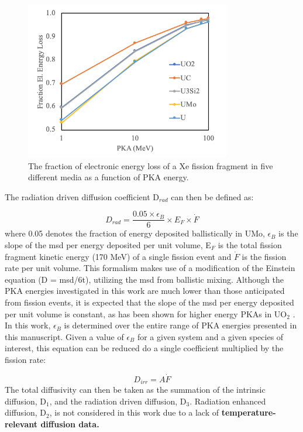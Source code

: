 \documentclass[review]{elsarticle}
\providecommand{\DIFaddtex}[1]{{\bf #1}} %
\providecommand{\DIFdeltex}[1]{} %
\providecommand{\DIFaddbegin}{\protect\color{blue}} %
\providecommand{\DIFaddend}{\protect\color{black}} %
\providecommand{\DIFdelbegin}{\protect\color{red}} %
\providecommand{\DIFdelend}{\protect\color{black}} %
\providecommand{\DIFadd}[1]{\texorpdfstring{\DIFaddtex{#1}}{#1}} %
\providecommand{\DIFdel}[1]{\texorpdfstring{\DIFdeltex{#1}}{}} %
\newcommand{\DIFscaledelfig}{0.5}
\newlength{\DIFdelgraphicswidth} %
\newlength{\DIFdelgraphicsheight} %
\newcommand{\DIFaddincludegraphics}[2][]{{\color{blue}\fbox{\DIFOincludegraphics[#1]{#2}}}} %
\newcommand{\DIFdelincludegraphics}[2][]{%
\sbox{\DIFdelgraphicsbox}{\DIFOincludegraphics[#1]{#2}}%
\settoboxwidth{\DIFdelgraphicswidth}{\DIFdelgraphicsbox} %
\settoboxtotalheight{\DIFdelgraphicsheight}{\DIFdelgraphicsbox} %
\scalebox{\DIFscaledelfig}{%
\parbox[b]{\DIFdelgraphicswidth}{\usebox{\DIFdelgraphicsbox}\\[-\baselineskip] \rule{\DIFdelgraphicswidth}{0em}}\llap{\resizebox{\DIFdelgraphicswidth}{\DIFdelgraphicsheight}{%
\setlength{\unitlength}{\DIFdelgraphicswidth}%
\begin{picture}(1,1)%
\thicklines\linethickness{2pt} %
{\color[rgb]{1,0,0}\put(0,0){\framebox(1,1){}}}%
{\color[rgb]{1,0,0}\put(0,0){\line( 1,1){1}}}%
{\color[rgb]{1,0,0}\put(0,1){\line(1,-1){1}}}%
\end{picture}%
}\hspace*{3pt}}} %
} %
\DeclareRobustCommand{\DIFaddbegin}{\DIFOaddbegin \let\includegraphics\DIFaddincludegraphics} %
\DeclareRobustCommand{\DIFaddend}{\DIFOaddend \let\includegraphics\DIFOincludegraphics} %
\DeclareRobustCommand{\DIFdelbegin}{\DIFOdelbegin \let\includegraphics\DIFdelincludegraphics} %
\DeclareRobustCommand{\DIFdelend}{\DIFOaddend \let\includegraphics\DIFOincludegraphics} %
\begin{document}
\begin{figure}[h]
 \centering
 \includegraphics[width=0.8\textwidth]{2_el_energy_loss.png} 
 \caption{The fraction of electronic energy loss of a Xe fission fragment in five different media as a function of PKA energy.}
 \label{fig:eloss}
\end{figure} 

The radiation driven diffusion coefficient D$_{rad}$ can then be defined as:

\begin{equation}
\label{eq:1}
D_{rad} = \frac{0.05 \times \epsilon_{B}}{6} \times E_{F} \times \dot F
\end{equation} where 0.05 denotes the fraction of energy deposited ballistically in UMo, $\epsilon_B$ is the slope of the msd per energy deposited per unit volume, E$_F$ is the total fission fragment kinetic energy (170 MeV) of a single fission event and $\dot F$ is the fission rate per unit volume. This formalism makes use of a modification of the Einstein equation (D = msd/6t), utilizing the msd from ballistic mixing. Although the PKA energies investigated in this work are much lower than those anticipated from fission events, it is expected that the slope of the msd per energy deposited per unit volume is constant, as has been shown for higher energy PKAs in UO$_2$ \cite{cooper2016}. In this work, $\epsilon_B$ is determined over the entire range of PKA energies presented in this manuscript. Given a value of $\epsilon_B$ for a given system and a given species of interest, this equation can be reduced do a single coefficient multiplied by the fission rate:

\begin{equation}
\label{eq:2}
D_{irr} = A \dot{F} 
\end{equation} The total diffusivity can then be taken as the summation of the intrinsic diffusion, D$_1$, and the radiation driven diffusion, D$_3$. Radiation enhanced diffusion, D$_2$, is not considered in this work due to a lack of \DIFdelbegin \DIFdel{temperature relevant diffusion data, 
}\DIFdelend \DIFaddbegin \DIFadd{temperature-relevant diffusion data. 
}\DIFaddend 
\end{document}
